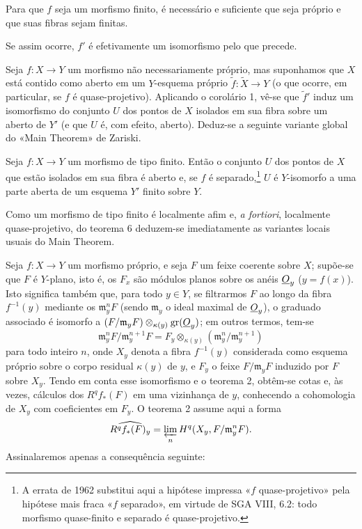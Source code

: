  Para que $f$ seja um morfismo finito, é necessário e
suficiente que seja próprio e que suas fibras sejam finitas.

Se assim ocorre, $f'$ é efetivamente um isomorfismo pelo que precede.

Seja $f:X\longrightarrow Y$ um morfismo não necessariamente próprio, mas
suponhamos que $X$ está contido como aberto em um $Y$-esquema próprio
$\widetilde f:\widetilde X\longrightarrow Y$ (o que ocorre, em particular,
se $f$ é quase-projetivo). Aplicando o corolário 1, vê-se que $\widetilde f'$
induz um isomorfismo do conjunto $U$ dos pontos de $X$ isolados em sua fibra
sobre um aberto de $Y'$ (e que $U$ é, com efeito, aberto). Deduz-se a
seguinte variante global do «Main Theorem» de Zariski.

 Seja
$f:X\longrightarrow Y$ um morfismo de tipo finito. Então o conjunto $U$ dos
pontos de $X$ que estão isolados em sua fibra é aberto e, se $f$ é
separado,\footnote{A errata de 1962 substitui aqui a hipótese impressa
«$f$ quase-projetivo» pela hipótese mais fraca «$f$ separado», em virtude de
SGA VIII, 6.2: todo morfismo quase-finito e separado é quase-projetivo.} $U$ é
$Y$-isomorfo a uma parte aberta de um esquema $Y'$ finito sobre $Y$.

Como um morfismo de tipo finito é localmente afim e, \textit{a fortiori},
localmente quase-projetivo, do teorema 6 deduzem-se imediatamente as variantes
locais usuais do Main Theorem.


Seja $f:X\longrightarrow Y$ um morfismo próprio, e seja $F$ um feixe coerente sobre
$X$; supõe-se que $F$ é $Y$-plano, isto é, os $F_x$ são módulos planos sobre os
anéis $\underline{O}_y$ ($y=f(x)$). Isto significa também que, para todo $y\in Y$, se
filtrarmos $F$ ao longo da fibra $f^{-1}(y)$ mediante os
$\mathfrak m_y^nF$ (sendo $\mathfrak m_y$ o ideal maximal de $\underline{O}_y$), o
graduado associado é isomorfo a
$(F/\mathfrak m_yF)\otimes_{\kappa(y)}\operatorname{gr}(\underline{O}_y)$; em outros
termos, tem-se
\[
  \mathfrak m_y^nF/\mathfrak m_y^{n+1}F
  =F_y\otimes_{\kappa(y)}
  (\mathfrak m_y^n/\mathfrak m_y^{n+1})
\]
para todo inteiro $n$, onde $X_y$ denota a fibra $f^{-1}(y)$ considerada como
esquema próprio sobre o corpo residual $\kappa(y)$ de $y$, e $F_y$ o feixe
$F/\mathfrak m_yF$ induzido por $F$ sobre $X_y$. Tendo em conta esse
isomorfismo e o teorema 2, obtêm-se cotas e, às vezes, cálculos dos
$R^qf_*(F)$ em uma vizinhança de $y$, conhecendo a cohomologia de $X_y$ com
coeficientes em $F_y$. O teorema 2 assume aqui a forma
\[
  \widehat{R^qf_*(F)_y}
  =\varprojlim_n H^q(X_y,F/\mathfrak m_y^nF).
\]
Assinalaremos apenas a consequência seguinte:

